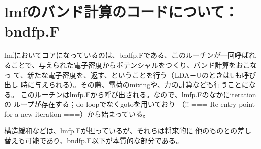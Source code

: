 \documentclass[a4paper,10pt,aip,onecolumn,amsmath,amssymb,floatfix,rmp]{revtex4-1}
\begin{document}
\section{lmfのバンド計算のコードについて：bndfp.F}
lmfにおいてコアになっているのは、bndfp.Fである、このルーチンが一回呼ばれ
ることで、与えられた電子密度からポテンシャルをつくり、バンド計算をおこなっ
て、新たな電子密度を、返す、ということを行う（LDA＋UのときはUも呼び出し
時に与えられる）。その際、電荷のmixingや、力の計算なども行うことになる。
このルーチンはlmfp.Fから呼び出される。なので、lmfp.Fのなかにiterationの
ループが存在する；do loopでなくgotoを用いており
（!! === Re-entry point for a new iteration ===）から始まっている。

構造緩和などは、lmfp.Fが担っているが、それらは将来的に
他のものとの差し替えも可能であり、bndfp.F以下が本質的な部分である。


\end{document}
